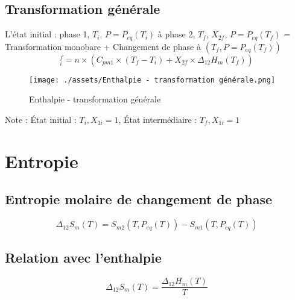 \subsection{Transformation générale} %
\label{sub:Transformation générale}
L'état initial : phase 1, $T_i$, $P= P _{eq}(T_i)$ à phase 2, $T_f$, $X_{2f}$, $P = P _{eq}(T_f)$ = Transformation monobare + Changement de phase à $(T_f, P = P _{eq}(T_f))$
\begin{equation}
  [H]_i ^{f} = n \times (C _{pm1} \times(T_f - T_i) + X _{2f} \times \Delta _{12}H_m(T_f))
\end{equation}

\begin{figure}[H] %
  \centering
  \texttt{[image: ./assets/Enthalpie - transformation générale.png]}
  \caption{Enthalpie - transformation générale}
\end{figure}

Note : État initial : $T_i, X _{1i} = 1$, État intermédiaire : $T_f, X _{1i}=1$


\section{Entropie} %
\label{sec:Entropie}


\subsection{Entropie molaire de changement de phase} %
\label{sub:Entropie molaire de changement de phase}
\begin{equation}
  \Delta _{12} S_m(T) = S _{m2}(T, P _{eq}(T) ) - S _{m1} (T, P _{eq}(T))
\end{equation}

\subsection{Relation avec l'enthalpie} %
\label{sub:Relation avec l'enthalpie}

\begin{equation}
  \Delta _{12}S_m(T) = \frac{
    \Delta _{12}H_m(T)
  }{T} 
\end{equation}

